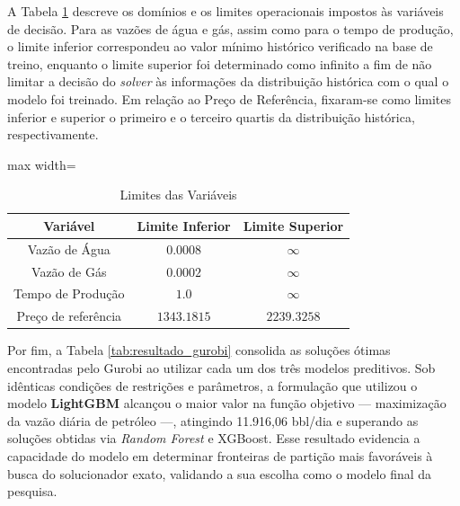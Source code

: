 A Tabela \ref{tab:restricoes} descreve os domínios e os limites operacionais impostos às variáveis de decisão. Para as vazões de água e gás, assim como para o tempo de produção, o limite inferior correspondeu ao valor mínimo histórico verificado na base de treino, enquanto o limite superior foi determinado como infinito a fim de não limitar a decisão do \textit{solver} às informações da distribuição histórica com o qual o modelo foi treinado. Em relação ao Preço de Referência, fixaram-se como limites inferior e superior o primeiro e o terceiro quartis da distribuição histórica, respectivamente.

\begin{table}[]
    \centering
    \captionsetup{justification=centering}
    \caption{Limites das Variáveis}
    \label{tab:restricoes}
    \small 
    \setlength{\tabcolsep}{3pt} %
    \begin{adjustbox}{max width=\textwidth}
    \begin{tabular}{ccc}
        \toprule
        Variável & Limite Inferior & Limite Superior \\
        \midrule
        Vazão de Água & $0.0008$ & $\infty$\\
        Vazão de Gás & $0.0002$ & $\infty$\\
        Tempo de Produção & $1.0$ & $\infty$\\
        Preço de referência & $1343.1815$ & $2239.3258$\\
        \bottomrule
    \end{tabular}
    \end{adjustbox}
\end{table}

Por fim, a Tabela \ref{tab:resultado_gurobi} consolida as soluções ótimas encontradas pelo Gurobi ao utilizar cada um dos três modelos preditivos. Sob idênticas condições de restrições e parâmetros, a formulação que utilizou o modelo \textbf{LightGBM} alcançou o maior valor na função objetivo — maximização da vazão diária de petróleo —, atingindo 11.916,06 bbl/dia e superando as soluções obtidas via \textit{Random Forest} e XGBoost. Esse resultado evidencia a capacidade do modelo em determinar fronteiras de partição mais favoráveis à busca do solucionador exato, validando a sua escolha como o modelo final da pesquisa.

